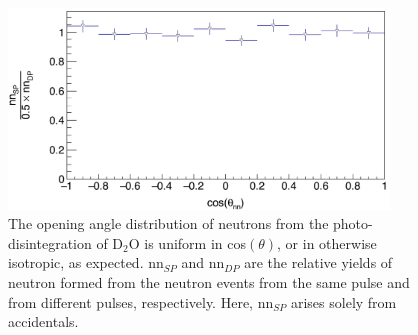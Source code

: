 \begin{figure}[h]
\includegraphics[width=0.9\textwidth]{Content/Methods/D2Otheta_nn.png}
\caption{The opening angle distribution of neutrons from the photo-disintegration of D$_{2}$O  is uniform in cos$(\theta)$, or in otherwise isotropic, as expected.
nn$_{SP}$ and nn$_{DP}$ are the relative yields of neutron formed from the neutron events from the same pulse and from different pulses, respectively.
Here, nn$_{SP}$ arises solely from accidentals.}
\label{fig:D2Otheta_nn}
\end{figure}

\FloatBarrier
